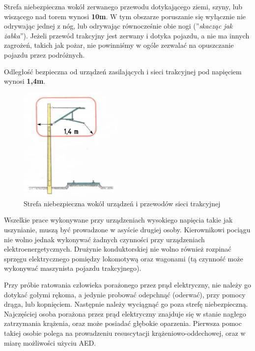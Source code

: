 Strefa niebezpieczna wokół zerwanego przewodu dotykającego ziemi, szyny, lub wiszącego nad torem wynosi \textbf{10m}. W tym obszarze poruszanie się wyłącznie nie odrywając jednej z nóg, lub odrywając równocześnie obie nogi (''\textit{skacząc jak żabka}''). Jeżeli przewód trakcyjny jest zerwany i dotyka pojazdu, a nie ma innych zagrożeń, takich jak pożar, nie powinniśmy w ogóle zezwalać na opuszczanie pojazdu przez podróżnych.

Odległość bezpieczna od urządzeń zasilających i sieci trakcyjnej pod napięciem wynosi \textbf{1,4m}.
\begin{figure}
	\includegraphics[width=5cm]{skryptkierownik-img/strefa-niebezpieczna-trakcja-14.png}
	\caption{Strefa niebezpieczna wokół urządzeń i przewodów sieci trakcyjnej}
	\label{fig:strefa}
\end{figure}
Wszelkie prace wykonywane przy urządzeniach wysokiego napięcia takie jak uszynianie, muszą być prowadzone w asyście drugiej osoby. Kierownikowi pociągu nie wolno jednak wykonywać żadnych czynności przy urządzeniach elektroenergetycznych. Drużynie konduktorskiej nie wolno również rozpinać sprzęgu elektrycznego pomiędzy lokomotywą oraz wagonami (tą czynność może wykonywać maszynista pojazdu trakcyjnego).

Przy próbie ratowania człowieka porażonego przez prąd elektryczny, nie należy go dotykać gołymi rękoma, a jedynie probować odepchnąć (oderwać), przy pomocy drąga, lub kopnięciem. Następnie należy wyciągnąć go poza strefę niebezpieczną. Najczęściej osoba porażona przez prąd elektryczny znajduje się w stanie nagłego zatrzymania krążenia, oraz może posiadać głębokie oparzenia. Pierwsza pomoc takiej osobie polega na prowadzeniu resuscytacji krążeniowo-oddechowej, oraz w miarę możliwości użyciu AED.






